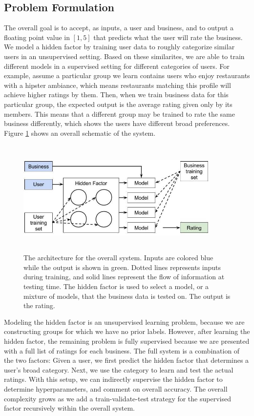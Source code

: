 \documentclass[11pt]{article}
\begin{document}
\subsection{Problem Formulation}
The overall goal is to accept, as inputs, a user and business, and to output a floating point value in $[1, 5]$ that predicts what the user will rate the business. We model a hidden factor by training user data to roughly categorize similar users in an unsupervised setting. Based on these similarites, we are able to train different models in a supervised setting for different categories of users. For example, assume a particular group we learn contains users who enjoy restaurants with a hipster ambiance, which means restaurants matching this profile will achieve higher ratings by them. Then, when we train business data for this particular group, the expected output is the average rating given only by its members. This means that a different group may be trained to rate the same business differently, which shows the users have different broad preferences. Figure \ref{fig:system} shows an overall schematic of the system.\\

\begin{figure}[h!]
    \centering
    \includegraphics[width=0.9\textwidth, height=5.75cm]{architecture}
    \caption{The architecture for the overall system. Inputs are colored blue while the output is shown in green. Dotted lines represents inputs during training, and solid lines represent the flow of information at testing time. The hidden factor is used to select a model, or a mixture of models, that the business data is tested on. The output is the rating.}
    \label{fig:system}
\end{figure} 

Modeling the hidden factor is an unsupervised learning problem, because we are constructing groups for which we have no prior labels. However, after learning the hidden factor, the remaining problem is fully supervised because we are presented with a full list of ratings for each business. The full system is a combination of the two factors: Given a user, we first predict the hidden factor that determines a user's broad category. Next, we use the category to learn and test the actual ratings. With this setup, we can indirectly supervise the hidden factor to determine hyperparameters, and comment on overall accuracy. The overall complexity grows as we add a train-validate-test strategy for the supervised factor recursively within the overall system.
\end{document}
